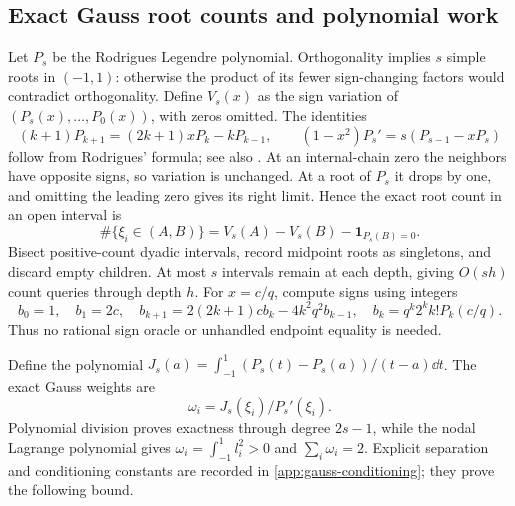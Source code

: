 \subsection{Exact Gauss root counts and polynomial work}
\label{subsec:gauss-provider}
Let \(P_s\) be the Rodrigues Legendre polynomial. Orthogonality implies
\(s\) simple roots in \((-1,1)\): otherwise the product of its fewer
sign-changing factors would contradict orthogonality.
Define \(V_s(x)\) as the sign variation of
\((P_s(x),\ldots,P_0(x))\), with zeros omitted.
The identities
\[
 (k+1)P_{k+1}=(2k+1)xP_k-kP_{k-1},\qquad
 (1-x^2)P_s'=s(P_{s-1}-xP_s)
\]
follow from Rodrigues' formula; see also \cite{dlmflegendre}.
At an internal-chain zero the neighbors have opposite signs, so variation
is unchanged. At a root of \(P_s\) it drops by one, and omitting the
leading zero gives its right limit. Hence the exact root count in an
open interval is
\begin{equation}
 \#\{\xi_i\in(A,B)\}
 =V_s(A)-V_s(B)-\mathbf1_{P_s(B)=0}.
 \label{eq:legendre-open-count}
\end{equation}
Bisect positive-count dyadic intervals, record midpoint roots as
singletons, and discard empty children. At most \(s\) intervals remain
at each depth, giving \(O(sh)\) count queries through depth \(h\).
For \(x=c/q\), compute signs using integers
\begin{equation}
 b_0=1,\quad b_1=2c,\quad
 b_{k+1}=2(2k+1)c b_k-4k^2q^2b_{k-1},
 \quad b_k=q^k2^kk!P_k(c/q).
 \label{eq:integer-legendre}
\end{equation}
Thus no rational sign oracle or unhandled endpoint equality is needed.

Define the polynomial
\(J_s(a)=\int_{-1}^1(P_s(t)-P_s(a))/(t-a)\dd t\).
The exact Gauss weights are
\begin{equation}
 \omega_i=J_s(\xi_i)/P_s'(\xi_i).
 \label{eq:rational-gauss-weight}
\end{equation}
Polynomial division proves exactness through degree \(2s-1\), while
the nodal Lagrange polynomial gives
\(\omega_i=\int_{-1}^1l_i^2>0\) and \(\sum_i\omega_i=2\).
Explicit separation and conditioning constants are recorded in
\cref{app:gauss-conditioning}; they prove the following bound.

